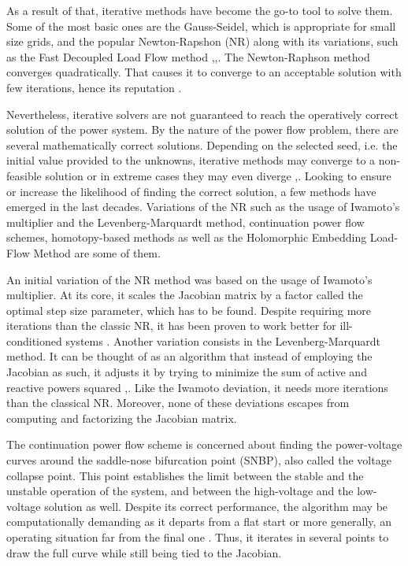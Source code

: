 \documentclass[journal]{IEEEtran}
\begin{document}
As a result of that, iterative methods have become the go-to tool to solve them. Some of the most basic ones are the Gauss-Seidel, which is appropriate for small size grids, and the popular Newton-Rapshon (NR) along with its variations, such as the Fast Decoupled Load Flow method \cite{hongfu},\cite{kothari},\cite{Stott}. The Newton-Raphson method converges quadratically. That causes it to converge to an acceptable solution with few iterations, hence its reputation \cite{gomez}.

Nevertheless, iterative solvers are not guaranteed to reach the operatively correct solution of the power system. By the nature of the power flow problem, there are several mathematically correct solutions. Depending on the selected seed, i.e. the initial value provided to the unknowns, iterative methods may converge to a non-feasible solution or in extreme cases they may even diverge \cite{11ill_tripathy},\cite{11ill_bonini}. Looking to ensure or increase the likelihood of finding the correct solution, a few methods have emerged in the last decades. Variations of the NR such as the usage of Iwamoto's multiplier and the Levenberg-Marquardt method, continuation power flow schemes, homotopy-based methods as well as the Holomorphic Embedding Load-Flow Method are some of them.

An initial variation of the NR method was based on the usage of Iwamoto's multiplier. At its core, it scales the Jacobian matrix by a factor called the optimal step size parameter, which has to be found. Despite requiring more iterations than the classic NR, it has been proven to work better for ill-conditioned systems \cite{iwamoto}. Another variation consists in the Levenberg-Marquardt method. It can be thought of as an algorithm that instead of employing the Jacobian as such, it adjusts it by trying to minimize the sum of active and reactive powers squared \cite{lagace},\cite{milano}. Like the Iwamoto deviation, it needs more iterations than the classical NR. Moreover, none of these deviations escapes from computing and factorizing the Jacobian matrix. 

The continuation power flow scheme is concerned about finding the power-voltage curves around the saddle-nose bifurcation point (SNBP), also called the voltage collapse point. This point establishes the limit between the stable and the unstable operation of the system, and between the high-voltage and the low-voltage solution as well. Despite its correct performance, the algorithm may be computationally demanding as it departs from a flat start or more generally, an operating situation far from the final one \cite{11ill_bonini}. Thus, it iterates in several points to draw the full curve while still being tied to the Jacobian.
\end{document}
